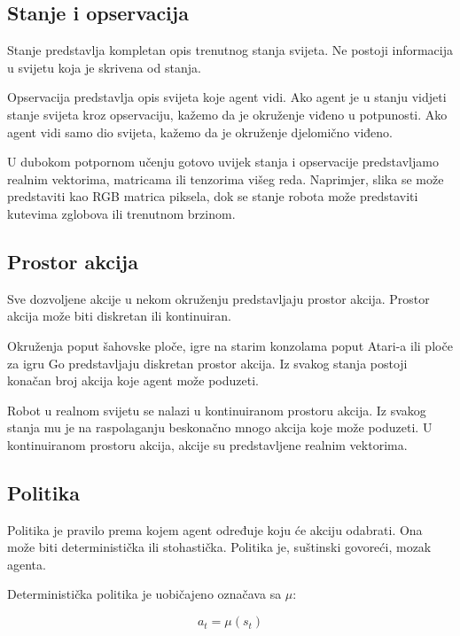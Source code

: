 \documentclass[times,utf8,diplomski]{fer}
\begin{document}
\subsection{Stanje i opservacija}

Stanje predstavlja kompletan opis trenutnog stanja svijeta. Ne postoji informacija u svijetu koja je skrivena od stanja.

Opservacija predstavlja opis svijeta koje agent vidi. Ako agent je u stanju vidjeti stanje svijeta kroz opservaciju, kažemo da je okruženje viđeno u potpunosti. Ako agent vidi samo dio svijeta, kažemo da je okruženje djelomično viđeno.

U dubokom potpornom učenju gotovo uvijek stanja i opservacije predstavljamo realnim vektorima, matricama ili tenzorima višeg reda. Naprimjer, slika se može predstaviti kao RGB matrica piksela, dok se stanje robota može predstaviti kutevima zglobova ili trenutnom brzinom.

\subsection{Prostor akcija}

Sve dozvoljene akcije u nekom okruženju predstavljaju prostor akcija. Prostor akcija može biti diskretan ili kontinuiran.

Okruženja poput šahovske ploče, igre na starim konzolama poput Atari-a ili ploče za igru Go predstavljaju diskretan prostor akcija. Iz svakog stanja postoji konačan broj akcija koje agent može poduzeti.

Robot u realnom svijetu se nalazi u kontinuiranom prostoru akcija. Iz svakog stanja mu je na raspolaganju beskonačno mnogo akcija koje može poduzeti. U kontinuiranom prostoru akcija, akcije su predstavljene realnim vektorima.

\subsection{Politika}

Politika je pravilo prema kojem agent određuje koju će akciju odabrati. Ona može biti deterministička ili stohastička. Politika je, suštinski govoreći, mozak agenta.

Deterministička politika je uobičajeno označava sa ${\mu}$:

\begin{equation}
	\label{deterministic policy}
	a_t = \mu(s_t)
\end{equation}
\end{document}
